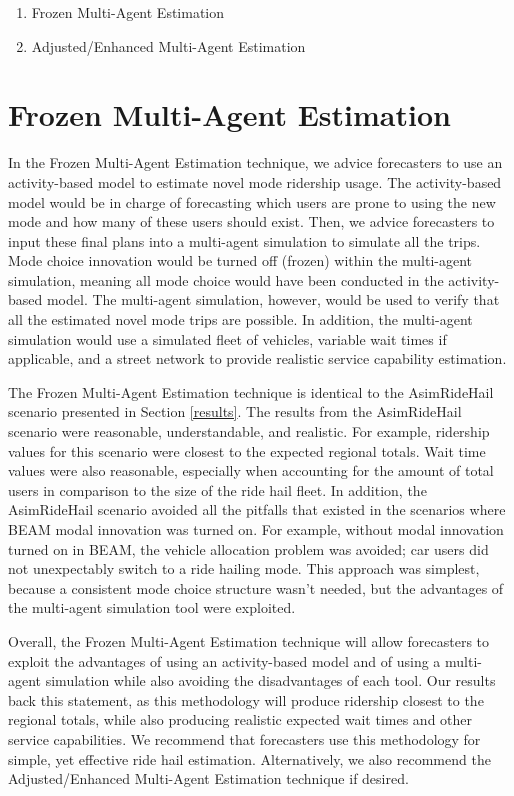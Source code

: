 \documentclass[12pt, oneside, openright]{byuthesis}
\providecommand{\tightlist}{%
  \setlength{\itemsep}{0pt}\setlength{\parskip}{0pt}}
\begin{document}
\begin{enumerate}
\def\labelenumi{\arabic{enumi}.}
\tightlist
\item
  Frozen Multi-Agent Estimation
\item
  Adjusted/Enhanced Multi-Agent Estimation
\end{enumerate}

\hypertarget{frozen-multi-agent-estimation}{%
\section{Frozen Multi-Agent Estimation}\label{frozen-multi-agent-estimation}}

In the Frozen Multi-Agent Estimation technique, we advice forecasters to use an activity-based model to estimate novel mode ridership usage. The activity-based model would be in charge of forecasting which users are prone to using the new mode and how many of these users should exist. Then, we advice forecasters to input these final plans into a multi-agent simulation to simulate all the trips. Mode choice innovation would be turned off (frozen) within the multi-agent simulation, meaning all mode choice would have been conducted in the activity-based model. The multi-agent simulation, however, would be used to verify that all the estimated novel mode trips are possible. In addition, the multi-agent simulation would use a simulated fleet of vehicles, variable wait times if applicable, and a street network to provide realistic service capability estimation.

The Frozen Multi-Agent Estimation technique is identical to the AsimRideHail scenario presented in Section \ref{results}. The results from the AsimRideHail scenario were reasonable, understandable, and realistic. For example, ridership values for this scenario were closest to the expected regional totals. Wait time values were also reasonable, especially when accounting for the amount of total users in comparison to the size of the ride hail fleet. In addition, the AsimRideHail scenario avoided all the pitfalls that existed in the scenarios where BEAM modal innovation was turned on. For example, without modal innovation turned on in BEAM, the vehicle allocation problem was avoided; car users did not unexpectably switch to a ride hailing mode. This approach was simplest, because a consistent mode choice structure wasn't needed, but the advantages of the multi-agent simulation tool were exploited.

Overall, the Frozen Multi-Agent Estimation technique will allow forecasters to exploit the advantages of using an activity-based model and of using a multi-agent simulation while also avoiding the disadvantages of each tool. Our results back this statement, as this methodology will produce ridership closest to the regional totals, while also producing realistic expected wait times and other service capabilities. We recommend that forecasters use this methodology for simple, yet effective ride hail estimation. Alternatively, we also recommend the Adjusted/Enhanced Multi-Agent Estimation technique if desired.
\end{document}
